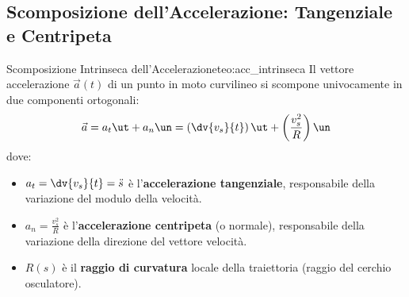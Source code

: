 \begin{center}
\end{center}

\subsection{Scomposizione dell'Accelerazione: Tangenziale e Centripeta}

\begin{teorema}{Scomposizione Intrinseca dell'Accelerazione}{teo:acc_intrinseca}
Il vettore accelerazione $\vec{a}(t)$ di un punto in moto curvilineo si scompone univocamente in due componenti ortogonali:
\begin{equation}
    \vec{a} = a_t \ut + a_n \un = \left(\dv{v_s}{t}\right)\ut + \left(\frac{v_s^2}{R}\right)\un
    \label{eq:scomposizione_acc}
\end{equation}
dove:
\begin{itemize}
    \item $a_t = \dv{v_s}{t} = \ddot{s}$ è l'\textbf{accelerazione tangenziale}, responsabile della variazione del modulo della velocità.
    \item $a_n = \frac{v_s^2}{R}$ è l'\textbf{accelerazione centripeta} (o normale), responsabile della variazione della direzione del vettore velocità.
    \item $R(s)$ è il \textbf{raggio di curvatura} locale della traiettoria (raggio del cerchio osculatore).
\end{itemize}
\end{teorema}

